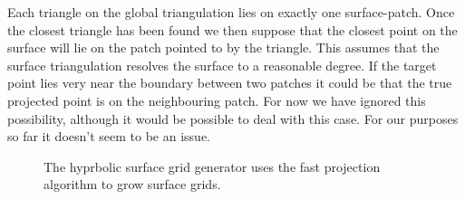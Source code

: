 \documentclass[11pt]{article}
\begin{document}
Each triangle on the global triangulation lies on exactly one surface-patch. 
Once the closest triangle has been found we then suppose that the closest
point on the surface will lie on the patch pointed to by the triangle. This assumes
that the surface triangulation resolves the surface to a reasonable degree. 
If the target point lies very near the boundary between two patches it could be that
the true projected point is on the neighbouring patch. For now we have ignored this possibility,
although it would be possible to deal with this case. For our purposes so far it doesn't
seem to be an issue.

\begin{figure}[hbt]
  \begin{center}
  \end{center}
\caption{The hyprbolic surface grid generator uses the fast projection algorithm to grow surface grids.}
\end{figure}



\vfill\eject



\end{document}
